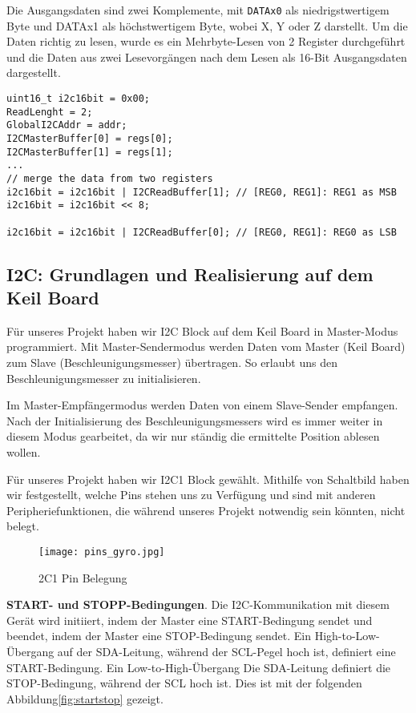 Die Ausgangsdaten sind zwei Komplemente, mit \texttt{DATAx0} als niedrigstwertigem Byte und DATAx1 als höchstwertigem Byte, wobei X, Y oder Z darstellt. Um die Daten richtig zu lesen, wurde es ein Mehrbyte-Lesen von 2 Register durchgeführt und die Daten aus zwei Lesevorgängen nach dem Lesen als 16-Bit Ausgangsdaten dargestellt. 

\begin{lstlisting}
uint16_t i2c16bit = 0x00;
ReadLenght = 2;
GlobalI2CAddr = addr;
I2CMasterBuffer[0] = regs[0];
I2CMasterBuffer[1] = regs[1];
...
// merge the data from two registers
i2c16bit = i2c16bit | I2CReadBuffer[1]; // [REG0, REG1]: REG1 as MSB
i2c16bit = i2c16bit << 8;

i2c16bit = i2c16bit | I2CReadBuffer[0]; // [REG0, REG1]: REG0 as LSB

\end{lstlisting}

\subsection{I2C: Grundlagen und Realisierung auf dem Keil Board}
Für unseres Projekt haben wir I2C Block auf dem Keil Board in Master-Modus programmiert. Mit Master-Sendermodus werden Daten vom Master (Keil Board) zum Slave (Beschleunigungsmesser) übertragen. So erlaubt uns den Beschleunigungsmesser zu initialisieren. 

Im Master-Empfängermodus werden Daten von einem Slave-Sender empfangen. Nach der Initialisierung des Beschleunigungsmessers wird es immer weiter in diesem Modus gearbeitet, da wir nur ständig die ermittelte Position ablesen wollen. 

Für unseres Projekt haben wir I2C1 Block gewählt. Mithilfe von Schaltbild haben wir festgestellt, welche Pins stehen uns zu Verfügung und sind mit anderen Peripheriefunktionen, die während unseres Projekt notwendig sein könnten, nicht belegt. 

\begin{figure}[!hb]
	\centering
	\texttt{[image: pins\_gyro.jpg]}
	\caption[I2C1 Pin Belegung]{2C1 Pin Belegung}
	\label{fig:i2cpins}
\end{figure}

\textbf{START- und STOPP-Bedingungen}. Die I2C-Kommunikation mit diesem Gerät wird initiiert, indem der Master eine START-Bedingung sendet und beendet, indem der Master eine STOP-Bedingung sendet. Ein High-to-Low-Übergang auf der SDA-Leitung, während der SCL-Pegel hoch ist, definiert eine START-Bedingung. Ein Low-to-High-Übergang Die SDA-Leitung definiert die STOP-Bedingung, während der SCL hoch ist. Dies ist mit der folgenden Abbildung\ref{fig:startstop} gezeigt. 

